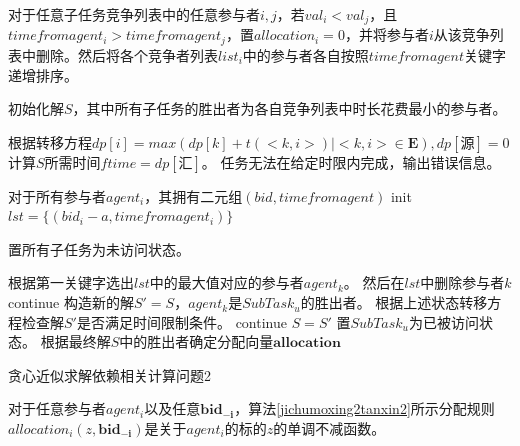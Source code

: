 \documentclass[promaster]{thesis-uestc}
\begin{document}
\begin{algorithm}[p]
    对于任意子任务竞争列表中的任意参与者$i,j$，若$val_i < val_j$，且$timefromagent_i > timefromagent_j$，置$allocation_i = 0$，并将参与者$i$从该竞争列表中删除。然后将各个竞争者列表$list_i$中的参与者各自按照$timefromagent$关键字递增排序。\;

    初始化解$S$，其中所有子任务的胜出者为各自竞争列表中时长花费最小的参与者。\;
    
    根据转移方程$dp[i] = max(dp[k]+t(<k,i>)|<k,i> \in \mathbf{E}),dp[\text{源}] = 0$计算$S$所需时间$ftime = dp[\text{汇}]$。\;
    {
        任务无法在给定时限内完成，输出错误信息。\;
    }

    对于所有参与者$agent_i$，其拥有二元组$(bid,timefromagent)$\;
    init $lst =\{(bid_i-a,timefromagent_i)\}$\;

    置所有子任务为未访问状态。\;

    {
        根据第一关键字选出$lst$中的最大值对应的参与者$agent_k$。\;
        然后在$lst$中删除参与者$k$\;
        {
            continue\;
        }
        构造新的解$S' = S$，$agent_k$是$SubTask_u$的胜出者。\;
        根据上述状态转移方程检查解$S'$是否满足时间限制条件。\;
        {
            continue\;
        }
        $S=S'$\;
        置$SubTask_u$为已被访问状态。\;
    }
    根据最终解$S$中的胜出者确定分配向量$\mathbf{allocation}$\;
\caption{贪心近似求解依赖相关计算问题2}
\label{jichumoxing2tanxin2}
\end{algorithm}

\begin{theorem}
对于任意参与者$agent_i$以及任意$\mathbf{bid_{-i}}$，算法\ref{jichumoxing2tanxin2}所示分配规则$allocation_i(z,\mathbf{bid_{-i}})$是关于$agent_i$的标的$z$的单调不减函数。
\end{theorem}
\end{document}
